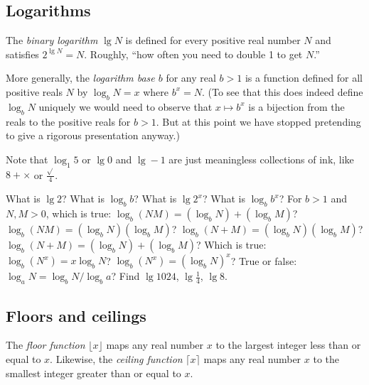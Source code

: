 \documentclass{tufte-handout}
\begin{document}
\subsection{Logarithms}

\begin{marginfigure}
\end{marginfigure}

The \emph{binary logarithm} $\lg N$ is defined for every positive real
number $N$ and satisfies $2^{\lg N} = N$. Roughly,
``how often you need to double 1 to get $N$.''

More generally, the \emph{logarithm base $b$} for any real $b>1$ is a
function defined for all positive reals $N$ by $\log_b N
= x$ where $b^x= N$.  (To see that this does indeed define $\log_b N$
uniquely we would need to observe that $x\mapsto b^x$ is a bijection
from the reals to the positive reals for $b> 1$. But at this point
we have stopped pretending to give a rigorous presentation anyway.)

Note that $\log_1 5$ or $\lg 0$ and $\lg -1$ are just meaningless
collections of ink, like $8+\times$ or $\frac{\sqrt{} }{4}$.

\begin{ExerciseList}
\Exercise What is $\lg 2$? What is $\log_b b$?
\Exercise What is $\lg 2^x$? What is $\log_b b^x$?
\Exercise For $b>1$ and $N,M>0$, which is true: 
  $\log_b (NM)= (\log_b N) + (\log_b M)$? 
  $\log_b (NM)= (\log_b N)( \log_b M)$? 
  $\log_b (N+M)= (\log_b N)( \log_b M)$? 
  $\log_b (N+M)= (\log_b N) + ( \log_b M)$? 
\Exercise Which is true: $\log_b (N^x)= x\log_b N$?
  $\log_b (N^x)= (\log_b N)^x$?
\Exercise True or false: $\log_a N = \log_b N / \log_b a$?
\Exercise Find $\lg 1024$, $\lg \frac{1}{4}$, $\lg 8$.
\end{ExerciseList}


\subsection{Floors and ceilings}

The \emph{floor function} $\lfloor x\rfloor$ maps any real number $x$
to the largest integer less than or equal to $x$. Likewise, the
\emph{ceiling function} $\lceil x\rceil$ maps any real number $x$ to
the smallest integer greater than or equal to $x$.
\end{document}
